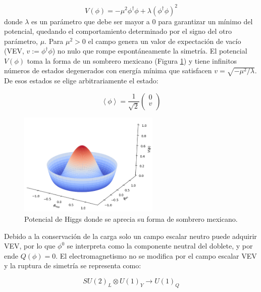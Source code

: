 \begin{equation}
	V(\phi) = - \mu^{2}\phi^{\dagger}\phi + \lambda(\phi^{\dagger}\phi)^{2}
	\label{eq:higgs_pot}
\end{equation}
%
donde $\lambda$ es un parámetro que debe ser mayor a $0$ para garantizar un mínimo del potencial, quedando el comportamiento determinado por el signo del otro parámetro, $\mu$. Para $\mu^2>0$ el campo genera un valor de expectación de vacío (VEV, $v:=\phi^{\dagger}\phi$) no nulo que rompe espontáneamente la simetría. El potencial $V(\phi)$ toma la forma de un sombrero mexicano (Figura \ref{fig:mexican_hat}) y tiene infinitos números de estados degenerados con energía mínima que satisfacen $v = \sqrt{-\mu^2/\lambda}$. De esos estados se elige arbitrariamente el estado:

\begin{equation}
	\left<\phi\right> = \frac{1}{\sqrt{2}}
	\begin{pmatrix}
	0 \\
	v \\
	\end{pmatrix}
\end{equation}

\begin{figure}
  \centering
  \includegraphics[width=0.6\textwidth]{images/mexican_hat.png}
  \caption{Potencial de Higgs donde se aprecia su forma de sombrero mexicano.}
  \label{fig:mexican_hat}
\end{figure}

Debido a la conservación de la carga solo un campo escalar neutro puede adquirir VEV, por lo que $\phi^0$ se interpreta como la componente neutral del doblete, y por ende $Q(\phi)=0$. El electromagnetismo no se modifica por el campo escalar VEV y la ruptura de simetría se representa como:

\begin{equation}
SU(2)_L \otimes U(1)_Y \rightarrow U(1)_Q
\end{equation}

